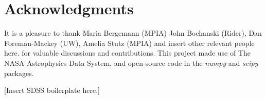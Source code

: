 \documentclass[12pt, preprint]{aastex}
\newcommand{\project}[1]{\textsl{#1}}
\newcommand{\tc}{\project{The~Cannon}}
\begin{document}

%
%
%
%

\section*{Acknowledgments}
It is a pleasure to thank Maria Bergemann (MPIA)
  John Bochanski (Rider),
  Dan Foreman-Mackey (UW), Amelia Stutz (MPIA) and
insert other relevant people here.
for valuable discussions and contributions.
This project made use of
  The NASA Astrophysics Data System,
  and open-source code in the \project{numpy} and \project{scipy} packages.

[Insert SDSS boilerplate here.]


\end{document}
